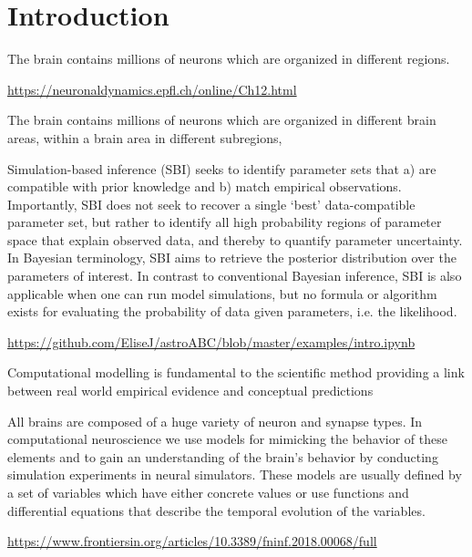 \chapter{Introduction}


The brain contains millions of neurons which are organized in different regions. 

\url{https://neuronaldynamics.epfl.ch/online/Ch12.html}

The brain contains millions of neurons which are organized in different brain areas, within a brain area in different subregions,


Simulation-based inference (SBI) seeks to identify parameter sets that a)
are compatible with prior knowledge and b) match empirical observations. Importantly,
SBI does not seek to recover a single ‘best’ data-compatible parameter set, but rather
to identify all high probability regions of parameter space that explain observed data,
and thereby to quantify parameter uncertainty. In Bayesian terminology, SBI aims to retrieve the posterior distribution over the parameters of interest. In contrast to conventional
Bayesian inference, SBI is also applicable when one can run model simulations, but no
formula or algorithm exists for evaluating the probability of data given parameters, i.e.
the likelihood.

\url{https://github.com/EliseJ/astroABC/blob/master/examples/intro.ipynb}

Computational modelling is fundamental to the scientific method providing a link between real world empirical evidence and conceptual predictions

All brains are composed of a huge variety of neuron and synapse types. In computational neuroscience we use models for mimicking the behavior of these elements and to gain an understanding of the brain's behavior by conducting simulation experiments in neural simulators. These models are usually defined by a set of variables which have either concrete values or use functions and differential equations that describe the temporal evolution of the variables.

\url{https://www.frontiersin.org/articles/10.3389/fninf.2018.00068/full}

